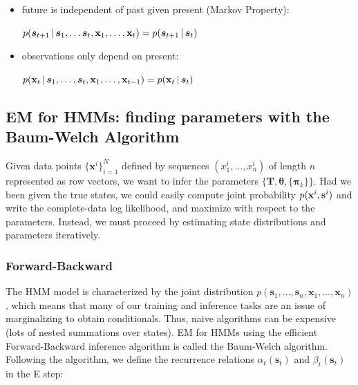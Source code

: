 \documentclass[12pt]{article}
\begin{document}
\begin{itemize}
	
	\item future is independent of past given present (Markov Property):
	
	$p(\boldsymbol{s}_{t+1}\,|\, \boldsymbol{s}_{1},\ldots\boldsymbol{s}_{t},\mathbf{x}_1,\ldots,
	\mathbf{x}_t)=p(\boldsymbol{s}_{t+1}\,|\, \boldsymbol{s}_t)$
	
	
	
	\item observations only depend on present:
	
	$p(\mathbf{x}_t\,|\, \boldsymbol{s}_1,\ldots,\boldsymbol{s}_t,\mathbf{x}_1,\ldots,\mathbf{x}_{t-1})=
	p(\mathbf{x}_t\,|\, \boldsymbol{s}_t)$
	
\end{itemize}


\subsection{EM for HMMs: finding parameters with the Baum-Welch Algorithm}

Given data points $\{\mathbf{x}^i\}_{i=1}^N$ defined by sequences $(x_1^{i},\ldots,x_n^{i})$ of length $n$ represented as row vectors, we want to infer the parameters $\{\mathbf{T}, \boldsymbol{\theta}, \{\boldsymbol{\pi}_k\}\}.$ Had we been given the true states, we could easily compute joint probability $p(\mathbf{x}^i,\mathbf{s}^i)$ and write the complete-data log likelihood, and maximize with respect to the parameters. Instead, we must proceed by estimating state distributions and parameters iteratively.


\subsubsection{Forward-Backward}


The HMM model is characterized by the joint distribution $p(\boldsymbol{s}_1,\ldots,\boldsymbol{s}_n,\mathbf{x}_1,\ldots,\mathbf{x}_n)$, which means that many of our training and inference tasks are an issue of marginalizing to obtain conditionals. Thus, naive algorithms can be expensive (lots of nested summations over states). EM for HMMs using the efficient Forward-Backward inference algorithm is called the Baum-Welch algorithm. Following the algorithm, we define the recurrence relations $\alpha_t(\boldsymbol{s}_t)$ and $\beta_t(\boldsymbol{s}_t)$ in the E step:
\end{document}
